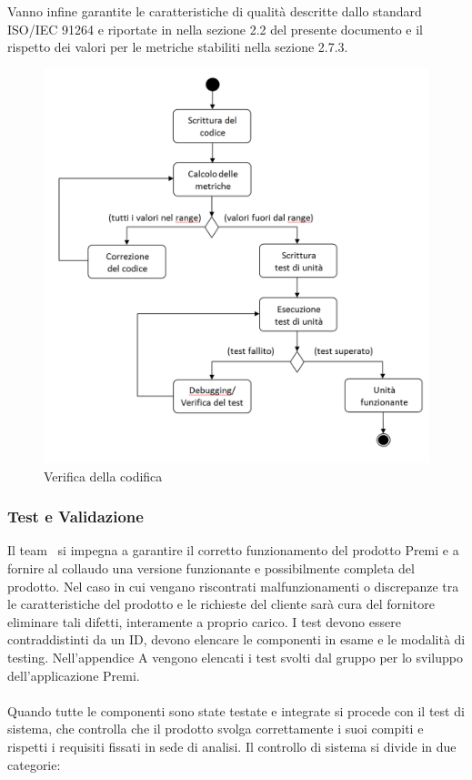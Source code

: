 Vanno infine garantite le caratteristiche di qualità descritte dallo standard ISO/IEC 91264 e riportate in nella sezione 2.2 del presente documento e il rispetto dei valori per le metriche stabiliti nella sezione 2.7.3.

\begin{figure}[h!]
	\centering
	\includegraphics[scale=.5]{img/schema_Test.png}
	\caption{Verifica della codifica}
\end{figure}

\subsubsection{Test e Validazione}
Il team \gruppo\ si impegna a garantire il corretto funzionamento del prodotto Premi e a fornire al collaudo una versione funzionante e possibilmente completa del prodotto. Nel caso in cui vengano riscontrati malfunzionamenti o discrepanze tra le caratteristiche del prodotto e le richieste del cliente sarà cura del fornitore eliminare tali difetti, interamente a proprio carico. I test devono essere contraddistinti da un ID, devono elencare le componenti in esame e le modalità di testing. Nell'appendice A vengono elencati i test svolti dal gruppo per lo sviluppo dell'applicazione Premi.\\ \\
Quando tutte le componenti sono state testate e integrate si procede con il test di sistema, che controlla che il prodotto svolga correttamente i suoi compiti e rispetti i requisiti fissati in sede di analisi. Il controllo di sistema si divide in due categorie:

